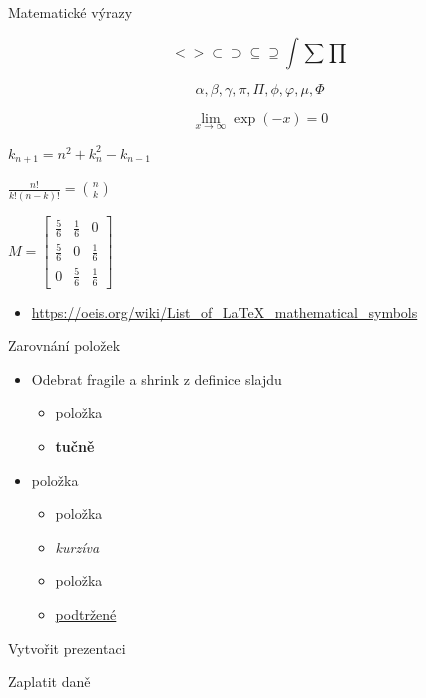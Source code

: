 \documentclass{beamer}
\begin{document}
\begin{frame}[fragile, shrink=0]{Matematické výrazy}

\begin{equation}
		< > \subset \supset \subseteq \supseteq \int \sum \prod
\end{equation}

	$$ \alpha, \beta, \gamma, \pi, \Pi, \phi, \varphi, \mu, \Phi $$
	
	$$\lim\limits_{x \to \infty} \exp(-x) = 0$$
	
	$k_{n+1} = n^2 + k_n^2 - k_{n-1}$ 
	
	\begin{math}
	\frac{n!}{k!(n-k)!} = \binom{n}{k}
	\end{math}
	

	$M = \begin{bmatrix}
       \frac{5}{6} & \frac{1}{6} & 0           \\[0.3em]
       \frac{5}{6} & 0           & \frac{1}{6} \\[0.3em]
       0           & \frac{5}{6} & \frac{1}{6}
     \end{bmatrix}$


\begin{itemize}
	\item 	\url{https://oeis.org/wiki/List_of_LaTeX_mathematical_symbols}
\end{itemize}
	
\end{frame}
\begin{frame}{Zarovnání položek}
	\begin{itemize}
		\item Odebrat fragile a shrink z definice slajdu
		      \begin{itemize}
			      \item položka
			      \item \textbf{tučně}
		      \end{itemize}
		\item položka
		      \begin{itemize}
			      \item položka
			      \item \emph{kurzíva}
			      \item položka
			      \item \underline{podtržené}
		      \end{itemize}
	\end{itemize}
	
	\cmark   Vytvořit prezentaci 

\xmark   Zaplatit daně 
\end{frame}
\end{document}
